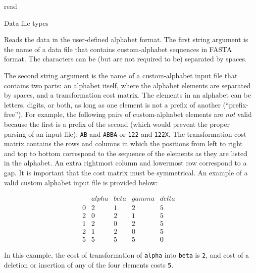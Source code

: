 \begin{command}{read}{}
\begin{arguments}
\begin{argumentgroup}{Data file types}
            {Reads the data in the user-defined alphabet format. The first string argument is
            the name of a data file that contains custom-alphabet sequences in FASTA format. 
            The characters can be (but are not required to be) separated by spaces.
            
            The second string argument is the name of a custom-alphabet input file that contains two parts:
            an alphabet itself, where the alphabet elements are separated by spaces, and a
            transformation cost matrix. The elements in an alphabet can be letters, digits, or
            both, as long as one element is not a prefix of another  (``prefix-free''). For
            example, the following pairs of custom-alphabet elements are \emph{not} valid
            because the first is a prefix of the second (which would prevent the proper parsing of
            an input file): \texttt{AB} and \texttt{ABBA} or \texttt{122} and \texttt{122X}.
            The transformation cost matrix contains the rows and columns in which the
            positions from left to right and top to bottom correspond to the sequence of the
            elements as they are listed in the alphabet. An extra rightmost column and lowermost
            row correspond to a gap. It is important that the cost matrix must be symmetrical. An example 
            of a valid custom alphabet input file is provided below:
       	  
            \begin{equation*}
                \begin{array}{lllll}
                      & alpha & beta & gamma & delta \\
                    0 &     2 &    1 &     2 &     5 \\
                    2 &     0 &    2 &     1 &     5 \\
                    1 &     2 &    0 &     2 &     5 \\
                    2 &     1 &    2 &     0 &     5 \\
                    5 &     5 &    5 &     5 &     0
                 \end{array}
            \end{equation*} 

           In this example, the cost of transformation of \texttt{alpha} into \texttt{beta} is \texttt{2},
           and cost of a deletion or insertion of any of the four elements costs \texttt{5}.
           
}
\end{argumentgroup}
\end{arguments}
\end{command}
